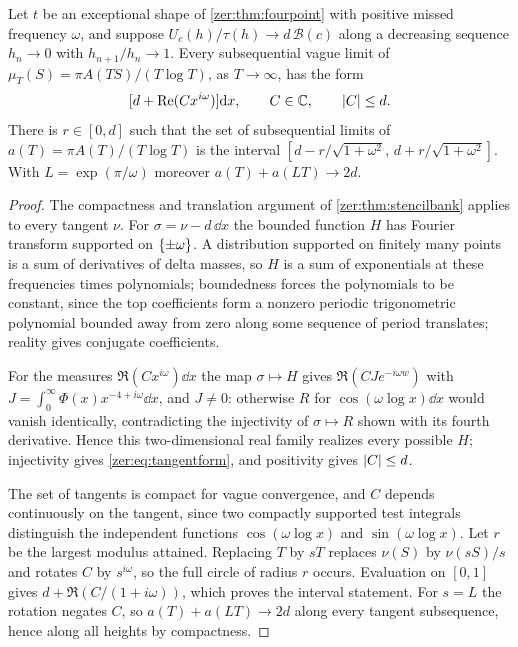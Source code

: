 \begin{theorem}\label{zer:thm:missingfreq}
Let $t$ be an exceptional shape of \cref{zer:thm:fourpoint} with positive missed frequency $\omega$, and
suppose $U_c(h)/\tau(h)\to d\,\mathcal B(c)$ along a decreasing sequence $h_n\to0$ with $h_{n+1}/h_n\to1$.
Every subsequential vague limit of $\mu_T(S)=\pi A(TS)/(T\log T)$, as $T\to\infty$, has the form
\begin{equation}\label{zer:eq:tangentform}
 [d+\operatorname{Re}(Cx^{i\omega})]\mathrm{d} x,\qquad C\in\mathbb{C},\qquad\lvert C\rvert\le d .
\end{equation}
There is $r\in[0,d]$ such that the set of subsequential limits of $a(T)=\pi A(T)/(T\log T)$ is the
interval $[d-r/\sqrt{1+\omega^2},\,d+r/\sqrt{1+\omega^2}]$. With $L=\exp(\pi/\omega)$ moreover
$a(T)+a(LT)\to2d$.
\end{theorem}
\begin{proof}
The compactness and translation argument of \cref{zer:thm:stencilbank} applies to every tangent $\nu$.
For $\sigma=\nu-d\,\dd x$ the bounded function $H$ has Fourier transform supported on $\{\pm\omega\}$. A
distribution supported on finitely many points is a sum of derivatives of delta masses, so $H$ is a sum
of exponentials at these frequencies times polynomials; boundedness forces the polynomials to be
constant, since the top coefficients form a nonzero periodic trigonometric polynomial bounded away from
zero along some sequence of period translates; reality gives conjugate coefficients.

For the measures $\Re(Cx^{i\omega})\dd x$ the map $\sigma\mapsto H$ gives $\Re(CJe^{-i\omega w})$ with
$J=\int_0^\infty\Phi(x)x^{-4+i\omega}\dd x$, and $J\ne0$: otherwise $R$ for $\cos(\omega\log x)\dd x$ would vanish
identically, contradicting the injectivity of $\sigma\mapsto R$ shown with its fourth derivative. Hence
this two-dimensional real family realizes every possible $H$; injectivity gives \eqref{zer:eq:tangentform},
and positivity gives $\lvert C\rvert\le d$.

The set of tangents is compact for vague convergence, and $C$ depends continuously on the tangent,
since two compactly supported test integrals distinguish the independent functions
$\cos(\omega\log x)$ and $\sin(\omega\log x)$. Let $r$ be the largest modulus attained. Replacing $T$ by $sT$
replaces $\nu(S)$ by $\nu(sS)/s$ and rotates $C$ by $s^{i\omega}$, so the full circle of radius $r$ occurs.
Evaluation on $[0,1]$ gives $d+\Re(C/(1+i\omega))$, which proves the interval statement. For $s=L$ the
rotation negates $C$, so $a(T)+a(LT)\to2d$ along every tangent subsequence, hence along all heights by
compactness.
\end{proof}

